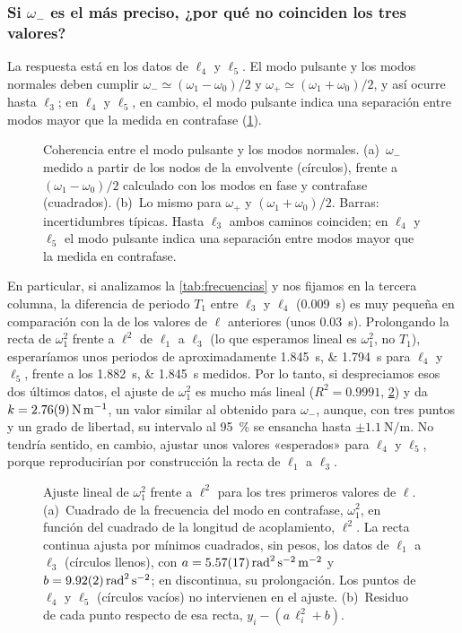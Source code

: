 \documentclass[a4paper,11pt]{amsart}
\numberwithin{equation}{section}
\newcommand{\wz}{\omega_0}                    %
\newcommand{\wu}{\omega_1}                    %
\newcommand{\wm}{\omega_{-}}                  %
\newcommand{\wpl}{\omega_{+}}                 %
\theoremstyle{cienplano}
\theoremstyle{ciendef}
\theoremstyle{cienobs}
\begin{document}
\subsubsection{Si $\wm$ es el más preciso, ¿por qué no coinciden los tres valores?}
La respuesta está en los datos de $\ell_4$ y $\ell_5$. El modo pulsante y los
modos normales deben cumplir $\wm\simeq(\wu-\wz)/2$ y $\wpl\simeq(\wu+\wz)/2$, y
así ocurre hasta $\ell_3$; en $\ell_4$ y $\ell_5$, en cambio, el modo pulsante
indica una separación entre modos mayor que la medida en contrafase
(\cref{fig:coherencia}).

\begin{figure}[ht]
\centering

\caption{Coherencia entre el modo pulsante y los modos normales. (a)~$\wm$
medido a partir de los nodos de la envolvente (círculos), frente a
$(\wu-\wz)/2$ calculado con los modos en fase y contrafase (cuadrados).
(b)~Lo mismo para $\wpl$ y $(\wu+\wz)/2$. Barras: incertidumbres típicas. Hasta
$\ell_3$ ambos caminos coinciden; en $\ell_4$ y $\ell_5$ el modo pulsante
indica una separación entre modos mayor que la medida en contrafase.}
\label{fig:coherencia}
\end{figure}

En particular, si analizamos la \cref{tab:frecuencias} y nos fijamos en la
tercera columna, la diferencia de periodo $T_1$ entre $\ell_3$ y $\ell_4$
(\SI{0,009}{\second}) es muy pequeña en comparación con la de los valores de
$\ell$ anteriores (unos \SI{0,03}{\second}). Prolongando la recta de $\wu^{2}$
frente a $\ell^{2}$ de $\ell_1$ a $\ell_3$ (lo que esperamos lineal es
$\wu^{2}$, no $T_1$), esperaríamos unos periodos de aproximadamente
\SIlist{1,845;1,794}{\second} para $\ell_4$ y $\ell_5$, frente a los
\SIlist{1,882;1,845}{\second} medidos. Por lo tanto, si despreciamos esos dos
últimos datos, el ajuste de $\wu^{2}$ es mucho más lineal
($R^{2}=\num{0,9991}$, \cref{fig:ajuste-tres}) y da
$k=\SI{2,76 \pm 0,09}{\newton\per\meter}$, un valor similar al obtenido para
$\wm$, aunque, con tres puntos y un grado de libertad, su intervalo al
\SI{95}{\percent} se ensancha hasta $\pm\SI{1,1}{\newton\per\meter}$. No tendría
sentido, en cambio, ajustar unos valores «esperados» para $\ell_4$ y $\ell_5$,
porque reproducirían por construcción la recta de $\ell_1$ a $\ell_3$.

\begin{figure}[ht]
\centering

\caption{Ajuste lineal de $\wu^{2}$ frente a $\ell^{2}$ para los tres primeros
valores de $\ell$. (a)~Cuadrado de la frecuencia del modo en contrafase,
$\wu^{2}$, en función del cuadrado de la longitud de acoplamiento,
$\ell^{2}$. La recta continua ajusta por mínimos cuadrados, sin pesos, los
datos de $\ell_1$ a $\ell_3$ (círculos llenos), con
$a=\SI{5,57 \pm 0,17}{\radian\squared\per\second\squared\per\meter\squared}$ y
$b=\SI{9,92 \pm 0,02}{\radian\squared\per\second\squared}$; en discontinua, su
prolongación. Los puntos de $\ell_4$ y $\ell_5$ (círculos vacíos) no
intervienen en el ajuste. (b)~Residuo de cada punto respecto de esa recta,
$y_i-(a\,\ell_i^{2}+b)$.}
\label{fig:ajuste-tres}
\end{figure}
\end{document}
